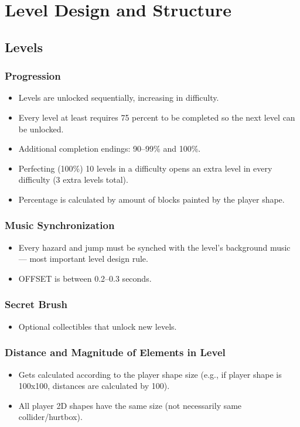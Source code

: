 \documentclass[11pt,a4paper]{report}
\begin{document}
\chapter{Level Design and Structure}
\section{Levels}
\subsection{Progression}
\begin{itemize}
  \item Levels are unlocked sequentially, increasing in difficulty.
  \item Every level at least requires 75 percent to be completed so the next level can be unlocked.
  \item Additional completion endings: 90--99\% and 100\%.
  \item Perfecting (100\%) 10 levels in a difficulty opens an extra level in every difficulty (3 extra levels total).
  \item Percentage is calculated by amount of blocks painted by the player shape.
\end{itemize}

\subsection{Music Synchronization}
\begin{itemize}
  \item Every hazard and jump must be synched with the level's background music — most important level design rule.
  \item OFFSET is between 0.2--0.3 seconds.
\end{itemize}

\subsection{Secret Brush}
\begin{itemize}
  \item Optional collectibles that unlock new levels.
\end{itemize}

\subsection{Distance and Magnitude of Elements in Level}
\begin{itemize}
  \item Gets calculated according to the player shape size (e.g., if player shape is 100x100, distances are calculated by 100).
  \item All player 2D shapes have the same size (not necessarily same collider/hurtbox).
\end{itemize}
\end{document}
